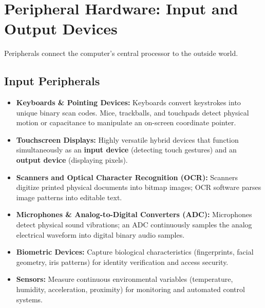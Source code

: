 \section{Peripheral Hardware: Input and Output Devices}

Peripherals connect the computer's central processor to the outside world.

\subsection{Input Peripherals}
\begin{itemize}[leftmargin=1.2em]
    \item \textbf{Keyboards \& Pointing Devices:} Keyboards convert keystrokes into unique binary scan codes. Mice, trackballs, and touchpads detect physical motion or capacitance to manipulate an on-screen coordinate pointer.
    \item \textbf{Touchscreen Displays:} Highly versatile hybrid devices that function simultaneously as an \textbf{input device} (detecting touch gestures) and an \textbf{output device} (displaying pixels).
    \item \textbf{Scanners and Optical Character Recognition (OCR):} Scanners digitize printed physical documents into bitmap images; OCR software parses image patterns into editable text.
    \item \textbf{Microphones \& Analog-to-Digital Converters (ADC):} Microphones detect physical sound vibrations; an ADC continuously samples the analog electrical waveform into digital binary audio samples.
    \item \textbf{Biometric Devices:} Capture biological characteristics (fingerprints, facial geometry, iris patterns) for identity verification and access security.
    \item \textbf{Sensors:} Measure continuous environmental variables (temperature, humidity, acceleration, proximity) for monitoring and automated control systems.
\end{itemize}

